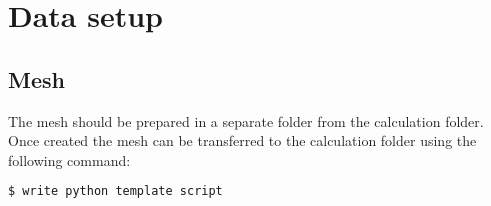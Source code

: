 \chapter{Data setup}

\section{Mesh}

The mesh should be prepared in a separate folder from the calculation folder. Once created the mesh can be transferred to the calculation folder using the following command:
\begin{lstlisting}[language=bash]
$ write python template script
\end{lstlisting}


